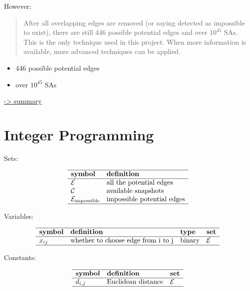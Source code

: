 \documentclass[
]{book}
\providecommand{\tightlist}{%
  \setlength{\itemsep}{0pt}\setlength{\parskip}{0pt}}
\begin{document}
However:

\begin{quote}
After all overlapping edges are removed (or saying detected as impossible to
exist), there are still 446 possible potential edges and over \(10^{45}\) SAs.
This is the only technique used in this project. When more information is
available, more advanced techniques can be applied.
\end{quote}

\begin{itemize}
\tightlist
\item
  446 possible potential edges
\item
  over \(10^{45}\) SAs
\end{itemize}

\protect\hyperlink{summary}{-\textgreater{} summary}

\hypertarget{IP}{%
\section{Integer Programming}\label{IP}}

Sets:

\[
\begin{array}{ll}
  \hline
  \textbf{symbol} & \textbf{definition} \\
  \hline
  \mathcal{E}
  & \text{all the potential edges} \\
  \mathcal{C}
  & \text{available snapshots} \\
  \mathcal{E}_\text{impossible}
  & \text{impossible potential edges} \\
  \hline
\end{array}
\]

Variables:

\[
\begin{array}{llll}
  \hline
  \textbf{symbol} & \textbf{definition} & \textbf{type} & \textbf{set} \\
  \hline
  x_{i j} & \text{whether to choose edge from i to j}
  & \text{binary} & \mathcal{E} \\
  \hline
\end{array}
\]

Constants:

\[
\begin{array}{lll}
  \hline
  \textbf{symbol} & \textbf{definition} & \textbf{set} \\
  \hline
  d_{i, j} & \text{Euclidean distance}
  & \mathcal{E} \\
  \hline
\end{array}
\]
\end{document}
